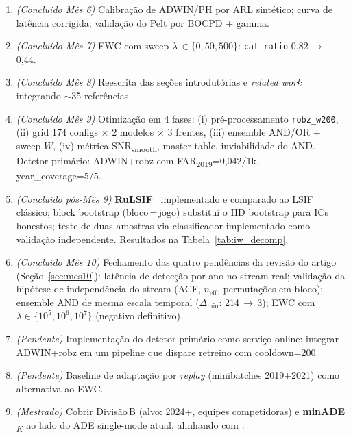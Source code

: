 \documentclass[11pt,a4paper]{article}
\begin{document}
\begin{enumerate}[leftmargin=1.6em,itemsep=2pt]
    \item \textit{(Conclu\'ido M\^es 6)} Calibra\c{c}\~ao de ADWIN/PH por
          ARL sint\'etico; curva de lat\^encia corrigida; valida\c{c}\~ao
          do Pelt por BOCPD + gamma.
    \item \textit{(Conclu\'ido M\^es 7)} EWC \cite{kirkpatrick2017} com
          sweep $\lambda$\,$\in\!\{0, 50, 500\}$: \texttt{cat\_ratio}
          0{,}82\,$\to$\,0{,}44.
    \item \textit{(Conclu\'ido M\^es 8)} Reescrita das se\c{c}\~oes
          introdut\'orias e \emph{related work} integrando $\sim$35
          refer\^encias.
    \item \textit{(Conclu\'ido M\^es 9)} Otimiza\c{c}\~ao em 4 fases:
          (i) pr\'e-processamento \texttt{robz\_w200},
          (ii) grid 174 configs $\times$ 2 modelos $\times$ 3 frentes,
          (iii) ensemble AND/OR + sweep $W$,
          (iv) m\'etrica SNR\textsubscript{smooth}, master table,
          inviabilidade do AND.
          Detetor prim\'ario: ADWIN+robz com
          FAR\textsubscript{2019}=0{,}042/1k, year\_coverage=5/5.
    \item \textit{(Conclu\'ido p\'os-M\^es 9)} \textbf{RuLSIF}~\cite{yamada2013}
          implementado e comparado ao LSIF cl\'assico; block bootstrap (bloco\,=\,jogo)
          substitu\'i o IID bootstrap para ICs honestos; teste de duas amostras
          via classificador \cite{lopezpaz2017} implementado como valida\c{c}\~ao
          independente. Resultados na Tabela~\ref{tab:iw_decomp}.
    \item \textit{(Conclu\'ido M\^es 10)} Fechamento das quatro
          pend\^encias da revis\~ao do artigo (Se\c{c}\~ao~\ref{sec:mes10}):
          latência de detec\c{c}\~ao por ano no stream real;
          valida\c{c}\~ao da hip\'otese de independ\^encia do stream
          (ACF, $n_\text{eff}$, permuta\c{c}\~oes em bloco);
          ensemble AND de mesma escala temporal
          ($\Delta_{\min}$: 214\,$\to$\,3); EWC com
          $\lambda\!\in\!\{10^5,10^6,10^7\}$ (negativo definitivo).
    \item \textit{(Pendente)} Implementa\c{c}\~ao do detetor prim\'ario
          como servi\c{c}o online: integrar ADWIN+robz em um pipeline
          que dispare retreino com cooldown=200.
    \item \textit{(Pendente)} Baseline de adapta\c{c}\~ao por
          \emph{replay} (minibatches 2019+2021) como alternativa ao EWC.
    \item \textit{(Mestrado)} Cobrir Divis\~ao\,B (alvo: 2024+, equipes
          competidoras) e \textbf{minADE\textsubscript{$K$}} ao lado
          do ADE single-mode atual, alinhando com \citet{salzmann2020,yuan2021}.
\end{enumerate}
\end{document}
